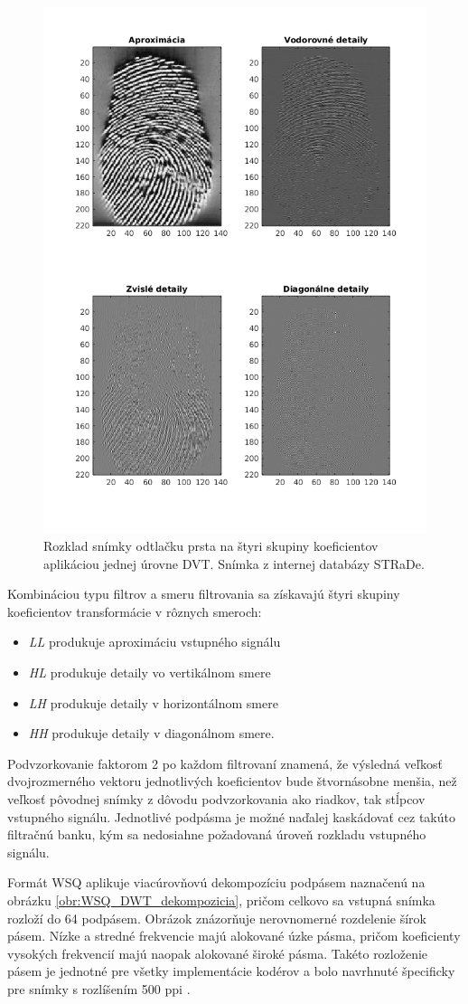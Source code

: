   \begin{figure}[h]
    \centering
    \includegraphics[width=0.5\linewidth]{obrazky-figures/DWT_rozklad_odtlacku.png}
    \caption{Rozklad snímky odtlačku prsta na štyri skupiny koeficientov aplikáciou jednej úrovne DVT. Snímka z internej databázy STRaDe.}
    \label{obr:dwt_rozklad_snimky}
  \end{figure}

  Kombináciou typu filtrov a smeru filtrovania sa získavajú štyri skupiny koeficientov transformácie v rôznych smeroch: 
  \begin{itemize}
    \item \emph{LL} produkuje aproximáciu vstupného signálu
    \item \emph{HL} produkuje detaily vo vertikálnom smere
    \item \emph{LH} produkuje detaily v horizontálnom smere
    \item \emph{HH} produkuje detaily v diagonálnom smere.
  \end{itemize}
  Podvzorkovanie faktorom 2 po každom filtrovaní znamená, že výsledná veľkosť dvojrozmerného vektoru jednotlivých koeficientov bude štvornásobne
  menšia, než veľkosť pôvodnej snímky z dôvodu podvzorkovania ako riadkov, tak stĺpcov vstupného signálu.
  Jednotlivé podpásma je možné naďalej kaskádovať cez takúto filtračnú banku, kým sa nedosiahne požadovaná úroveň rozkladu vstupného signálu.

  Formát WSQ aplikuje viacúrovňovú dekompozíciu podpásem naznačenú na obrázku \ref{obr:WSQ_DWT_dekompozicia}, pričom celkovo sa vstupná snímka rozloží
  do 64 podpásem. Obrázok znázorňuje nerovnomerné rozdelenie šírok pásem. Nízke a stredné frekvencie majú alokované úzke pásma, pričom koeficienty vysokých
  frekvencií majú naopak alokované široké pásma. Takéto rozloženie pásem je jednotné pre všetky implementácie kodérov a bolo navrhnuté špecificky pre snímky
  s rozlíšením 500 ppi \cite{brislawn1996compression}.

